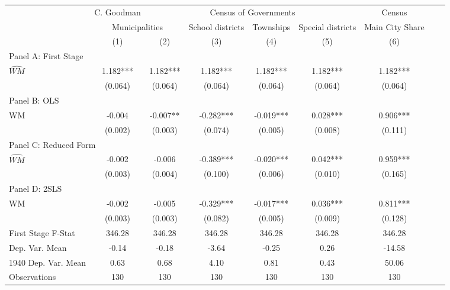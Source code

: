  \begin{tabular}{l*{8}{c}} \toprule
&\multicolumn{1}{c}{C. Goodman}&\multicolumn{4}{c}{Census of Governments}&\multicolumn{1}{c}{Census}\\\cmidrule(lr){2-2}\cmidrule(lr){3-6}\cmidrule(lr){7-7}
&\multicolumn{2}{c}{Municipalities}&\multicolumn{1}{c}{School districts}&\multicolumn{1}{c}{Townships}&\multicolumn{1}{c}{Special districts}&\multicolumn{1}{c}{Main City Share}\\\cmidrule(lr){2-3}\cmidrule(lr){4-6}\cmidrule(lr){7-7}
&\multicolumn{1}{c}{(1)}&\multicolumn{1}{c}{(2)}&\multicolumn{1}{c}{(3)}&\multicolumn{1}{c}{(4)}&\multicolumn{1}{c}{(5)}&\multicolumn{1}{c}{(6)}\\
\cmidrule(lr){1-7}
\multicolumn{6}{l}{Panel A: First Stage}\\
\cmidrule(lr){1-7}
$\widehat{WM}$  &    1.182***&    1.182***&    1.182***&    1.182***&    1.182***&    1.182***\\
                &  (0.064)   &  (0.064)   &  (0.064)   &  (0.064)   &  (0.064)   &  (0.064)   \\
\cmidrule(lr){1-7}
\multicolumn{6}{l}{Panel B: OLS}\\
\cmidrule(lr){1-7}
WM              &   -0.004   &   -0.007** &   -0.282***&   -0.019***&    0.028***&    0.906***\\
                &  (0.002)   &  (0.003)   &  (0.074)   &  (0.005)   &  (0.008)   &  (0.111)   \\
\cmidrule(lr){1-7}
\multicolumn{6}{l}{Panel C: Reduced Form}\\
\cmidrule(lr){1-7}
$\widehat{WM}$  &   -0.002   &   -0.006   &   -0.389***&   -0.020***&    0.042***&    0.959***\\
                &  (0.003)   &  (0.004)   &  (0.100)   &  (0.006)   &  (0.010)   &  (0.165)   \\
\cmidrule(lr){1-7}
\multicolumn{6}{l}{Panel D: 2SLS}\\
\cmidrule(lr){1-7}
WM              &   -0.002   &   -0.005   &   -0.329***&   -0.017***&    0.036***&    0.811***\\
                &  (0.003)   &  (0.003)   &  (0.082)   &  (0.005)   &  (0.009)   &  (0.128)   \\
\midrule
First Stage F-Stat&   346.28   &   346.28   &   346.28   &   346.28   &   346.28   &   346.28   \\
Dep. Var. Mean  &    -0.14   &    -0.18   &    -3.64   &    -0.25   &     0.26   &   -14.58   \\
1940 Dep. Var. Mean&     0.63   &     0.68   &     4.10   &     0.81   &     0.43   &    50.06   \\
Observations    &      130   &      130   &      130   &      130   &      130   &      130   \\
       \bottomrule \end{tabular}
